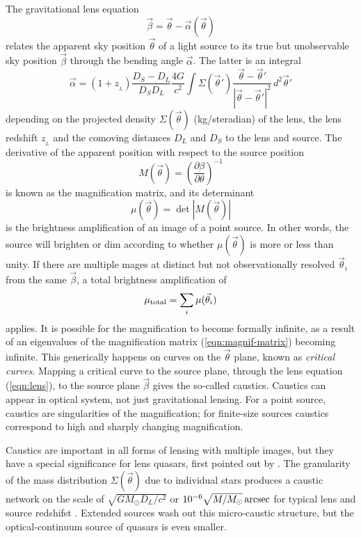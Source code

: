 \documentclass[usenatbib]{mn2e}
\begin{document}
The gravitational lens equation
\begin{equation}
\vec\beta = \vec\theta - \vec\alpha(\vec\theta)
\label{eqn:lens}
\end{equation}
relates the apparent sky position $\vec\theta$ of a light source to
its true but unobservable sky position $\vec\beta$ through the bending
angle $\vec\alpha$.  The latter is an integral 
\begin{equation}
\vec\alpha = (1+z_{_L})\frac{D_S-D_L}{D_SD_L} \frac{4G}{c^2}
\int \Sigma(\vec\theta')
\frac{\vec\theta-\vec\theta'}{|\vec\theta-\vec\theta'|^2}\,
d^2\vec\theta'
\label{eqn:alpha}
\end{equation}
depending on the projected density $\Sigma(\vec\theta)$ (kg/steradian)
of the lens, the lens redshift $z_{_L}$ and the comoving distances
$D_L$ and $D_S$ to the lens and source.  The derivative of the
apparent position with respect to the source position
\begin{equation}
M(\vec\theta) =
\left(\frac{\partial\beta}{\partial\theta}\right)^{-1}
\label{eqn:magnif-matrix}
\end{equation}
is known as the magnification matrix, and its determinant
\begin{equation}
\mu(\vec\theta) = \det|M(\vec\theta)|
\end{equation}
is the brightness amplification of an image of a point source.  In
other words, the source will brighten or dim according to whether
$\mu(\vec\theta)$ is more or less than unity.  If there are multiple
mages at distinct but not observationally resolved $\vec\theta_i$ from
the same $\vec\beta$, a total brightness amplification
of\begin{equation} \mu_{\rm total} = \sum_{i} \mu(\vec\theta_i)
\end{equation}
applies. It is possible for the magnification to become formally
infinite, as a result of an eigenvalues of the magnification matrix
(\ref{eqn:magnif-matrix}) becoming infinite.  This generically happens
on curves on the $\vec\theta$ plane, known as {\em critical curves}.
Mapping a critical curve to the source plane, through the lens
equation (\ref{eqn:lens}), to the source plane $\vec\beta$ gives the
so-called caustics.  Caustics can appear in optical system, not just
gravitational lensing.  For a point source, caustics are singularities
of the magnification; for finite-size sources caustics correspond to
high and sharply changing magnification.

Caustics are important in all forms of lensing with multiple images,
but they have a special significance for lens quasars, first pointed
out by \cite{1979Natur.282..561C}.  The granularity of the mass
distribution $\Sigma(\vec\theta)$ due to individual stars produces a
caustic network on the scale of $\sqrt{GM_\odot D_L/c^2}$ or $10^{-6}
\sqrt{M/M_\odot}\rm\,arcsec$ for typical lens and source redshifst
\citep{2001PASA...18..207W}.  Extended sources wash out this
micro-caustic structure, but the optical-continuum source of quasars
is even smaller.
\end{document}
